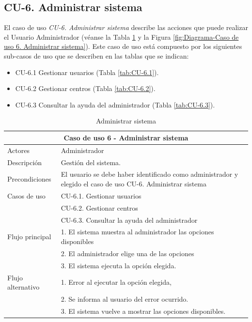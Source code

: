 \newpage


\subsection{CU-6. Administrar sistema}\label{sec:CU-6}    
El caso de uso \textit{CU-6. Administrar sistema  } describe las acciones que puede realizar el Usuario Administrador (véanse la Tabla \ref{tab:CU-6} y la Figura \ref{fig:Diagrama-Caso de uso 6. Administrar sistema}). Este caso de uso está compuesto por los siguientes sub-casos de uso que se describen en las tablas que se indican:
\begin{itemize}
  \item CU-6.1 Gestionar usuarios (Tabla \ref{tab:CU-6.1}).
  \item CU-6.2 Gestionar centros (Tabla \ref{tab:CU-6.2}).
  \item CU-6.3 Consultar la ayuda del administrador  (Tabla \ref{tab:CU-6.3}).
\end{itemize}

    \begin{table}[H]
        \caption{Administrar sistema}
        \label{tab:CU-6}
        \begin{center}
            \begin{tabular}{|l|p{10cm}|}
                \hline
                \multicolumn{2}{|c|}{Caso de uso 6 - Administrar sistema} \\ \hline \hline
                Actores                 &   Administrador        \\  \hline
                Descripción             &   Gestión del sistema. \\  \hline
                Precondiciones          &   El usuario se debe haber identificado como administrador y elegido el caso de uso CU-6. Administrar sistema           \\  \hline
                Casos de uso            
                & CU-6.1. Gestionar usuarios \\  
                & CU-6.2. Gestionar centros \\ 
                & CU-6.3. Consultar la ayuda del administrador \\
                \hline
                Flujo principal     & 1. El sistema muestra al administrador las opciones disponibles \\ 
                & 2. El administrador elige una de las opciones \\ 
                & 3. El sistema ejecuta la opción elegida. \\ 
                \hline
                Flujo alternativo    &   1. Error al ejecutar la opción elegida, \\ 
                & 2. Se informa al usuario del error ocurrido. \\ 
                & 3. El sistema vuelve a mostrar las opciones disponibles.  \\  
                \hline
            \end{tabular}
        \end{center}
    \end{table}
    
